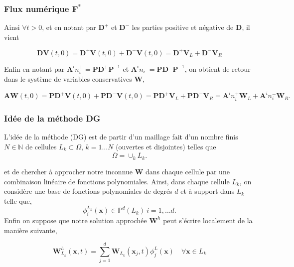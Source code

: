 \documentclass[9pt]{beamer}
\begin{document}
\begin{frame}
\frametitle{Flux numérique $\mathbf{F}^*$}
 Ainsi $\forall t > 0$, et en notant par $\mathbf{D}^+$ et $\mathbf{D}^-$ les parties positive et négative de $\mathbf{D}$, il vient

\begin{equation}
\mathbf{D} \mathbf{V}(t,0) = \mathbf{D}^+\mathbf{V}(t,0) + \mathbf{D}^-\mathbf{V}(t,0)  =  \mathbf{D}^+\mathbf{V}_L  + \mathbf{D}^-\mathbf{V}_R 
\end{equation}
 
 Enfin en notant par $\mathbf{A}^in_i^+= \mathbf{P}\mathbf{D}^+\mathbf{P}^{-1}$ et  $\mathbf{A}^in_i^-= \mathbf{P}\mathbf{D}^-\mathbf{P}^{-1}$, on obtient de retour dans le système de variables conservatives $\mathbf{W}$,
 
 \begin{equation}
 \label{flux1}
\mathbf{A} \mathbf{W}(t,0) = \mathbf{P} \mathbf{D}^+\mathbf{V}(t,0) + \mathbf{P}\mathbf{D}^-\mathbf{V}(t,0)  =  \mathbf{P}\mathbf{D}^+\mathbf{V}_L  + \mathbf{P} \mathbf{D}^-\mathbf{V}_R = \mathbf{A}^in_i^+\mathbf{W}_L + \mathbf{A}^in_i^-\mathbf{W}_R.
\end{equation}

\end{frame}




\begin{frame}
\frametitle{Idée de la méthode DG}
 L'idée de la méthode (DG) est de partir d'un maillage fait d'un nombre finis $N\in \mathbb{N}$ de cellules  $L_k \subset \Omega$, $k=1\dots N$ (ouvertes et disjointes) telles que
\begin{equation}
\bar{\Omega} = \cup_k \bar{L}_k.
\end{equation}

et de chercher à approcher notre inconnue $\mathbf{W}$ dans chaque cellule par une combinaison linéaire de fonctions polynomiales. Ainsi, dans chaque cellule $L_k$, on considère une base de fonctions polynomiales de degrés $d$ et à support dans $L_k$ telle que,
\begin{equation}
\phi^{L_k}_i(\mathbf{x}) \in \mathbb{P}^{d}(L_k)\ i=1,\dots d.
\end{equation}
Enfin on suppose que notre solution approchée $\mathbf{W}^h$ peut s'écrire localement de la manière suivante,

\begin{equation}
\label{approx}
\mathbf{W}^h_{L_k}(\mathbf{x},t) = \sum\limits_{j=1}^d \mathbf{W}_{L_k}(\mathbf{x}_j,t) \phi_j^L (\mathbf{x}) \quad \forall \mathbf{x} \in L_k
\end{equation}
\end{frame}
\end{document}
